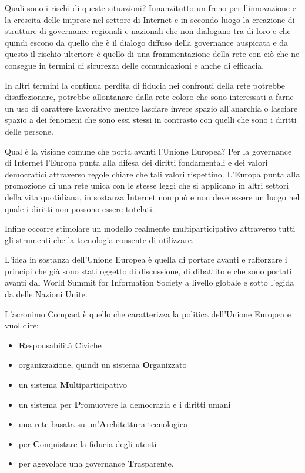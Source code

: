 Quali sono i rischi di queste situazioni? Innanzitutto un freno per l'innovazione e la crescita delle imprese nel settore di Internet e in secondo luogo la creazione di strutture di governance regionali e nazionali che non dialogano tra di loro e che quindi escono da quello che è il dialogo diffuso della governance auspicata e da questo il rischio ulteriore è quello di una frammentazione della rete con ciò che ne consegue in termini di sicurezza delle comunicazioni e anche di efficacia.\par
In altri termini la continua perdita di fiducia nei confronti della rete potrebbe disaffezionare, potrebbe allontanare dalla rete coloro che sono interessati a farne un uso di carattere lavorativo mentre lasciare invece spazio all'anarchia o lasciare spazio a dei fenomeni che sono essi stessi in contrasto con quelli che sono i diritti delle persone.\par
Qual è la visione comune che porta avanti l'Unione Europea? Per la governance di Internet l'Europa punta alla difesa dei diritti fondamentali e dei valori democratici attraverso regole chiare che tali valori rispettino. L'Europa punta alla promozione di una rete unica con le stesse leggi che si applicano in altri settori della vita quotidiana, in sostanza Internet non può e non deve essere un luogo nel quale i diritti non possono essere tutelati.\par
Infine occorre stimolare un modello realmente multiparticipativo attraverso tutti gli strumenti che la tecnologia consente di utilizzare.\par
L'idea in sostanza dell'Unione Europea è quella di portare avanti e rafforzare i principi che già sono stati oggetto di discussione, di dibattito e che sono portati avanti dal World Summit for Information Society a livello globale e sotto l'egida da delle Nazioni Unite. \par
L'acronimo Compact è quello che caratterizza la politica dell'Unione Europea e vuol dire:
\begin{itemize}
    \item \textbf{R}esponsabilità Civiche
    \item organizzazione, quindi un sistema \textbf{O}rganizzato
    \item un sistema \textbf{M}ultiparticipativo
    \item un sistema per \textbf{P}romuovere la democrazia e i diritti umani
    \item una rete basata su un'\textbf{A}rchitettura tecnologica
    \item per \textbf{C}onquistare la fiducia degli utenti
    \item per agevolare una governance \textbf{T}rasparente.
\end{itemize}
